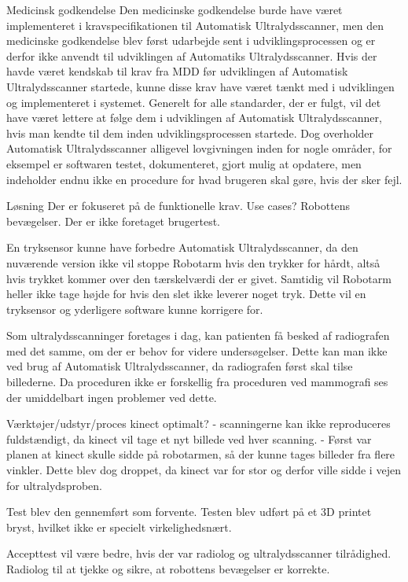 Medicinsk godkendelse
Den medicinske godkendelse burde have været implementeret i kravspecifikationen til Automatisk Ultralydsscanner, men den medicinske godkendelse blev først udarbejde sent i udviklingsprocessen og er derfor ikke anvendt til udviklingen af Automatiks Ultralydsscanner. Hvis der havde været kendskab til krav fra MDD før udviklingen af Automatisk Ultralydsscanner startede, kunne disse krav have været tænkt med i udviklingen og implementeret i systemet. Generelt for alle standarder, der er fulgt, vil det have været lettere at følge dem i udviklingen af Automatisk Ultralydsscanner, hvis man kendte til dem inden udviklingsprocessen startede. Dog overholder Automatisk Ultralydsscanner alligevel lovgivningen inden for nogle områder, for eksempel er softwaren testet, dokumenteret, gjort mulig at opdatere, men indeholder endnu ikke en procedure for hvad brugeren skal gøre, hvis der sker fejl. 

Løsning
Der er fokuseret på de funktionelle krav.
Use cases?
Robottens bevægelser. 
Der er ikke foretaget brugertest. 

En tryksensor kunne have forbedre Automatisk Ultralydsscanner, da den nuværende version ikke vil stoppe Robotarm hvis den trykker for hårdt, altså hvis trykket kommer over den tærskelværdi der er givet. Samtidig vil Robotarm heller ikke tage højde for hvis den slet ikke leverer noget tryk. Dette vil en tryksensor og yderligere software kunne korrigere for. 

Som ultralydsscanninger foretages i dag, kan patienten få besked af radiografen med det samme, om der er behov for videre undersøgelser. Dette kan man ikke ved brug af Automatisk Ultralydsscanner, da radiografen først skal tilse billederne. Da proceduren ikke er forskellig fra proceduren ved mammografi ses der umiddelbart ingen problemer ved dette. 

Værktøjer/udstyr/proces
kinect optimalt?
- scanningerne kan ikke reproduceres fuldstændigt, da kinect vil tage et nyt billede ved hver scanning. 
- Først var planen at kinect skulle sidde på robotarmen, så der kunne tages billeder fra flere vinkler. Dette blev dog droppet, da kinect var for stor og derfor ville sidde i vejen for ultralydsproben. 

Test
blev den gennemført som forvente.
Testen blev udført på et 3D printet bryst, hvilket ikke er specielt virkelighedsnært.  
 




Accepttest vil være bedre, hvis der var radiolog og ultralydsscanner tilrådighed. Radiolog til at tjekke og sikre, at robottens bevægelser er korrekte. 

